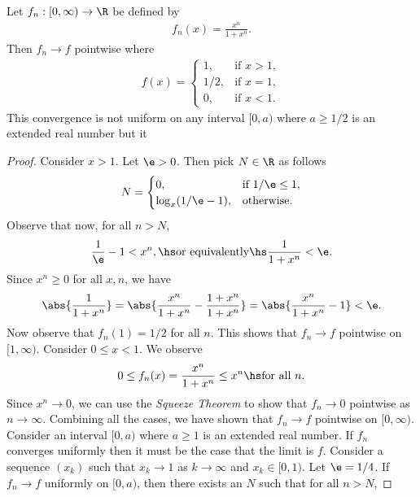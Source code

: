 \documentclass{article}
\begin{document}
\begin{claim*}
	Let $f_n:[0,\infty)\to\R$ be defined by
	\begin{align*}
		f_n(x) = \frac{x^n}{1+x^n}.
	\end{align*}
	Then $f_n\to f$ pointwise where
	\begin{align*}
		f(x) = \begin{cases}
			1,   & \text{if }x > 1, \\
			1/2, & \text{if }x = 1, \\
			0,   & \text{if }x < 1.
		\end{cases}
	\end{align*}
	This convergence is not uniform on any interval $[0, a)$ where
	$a\geq 1/2$ is an extended real number but it
\end{claim*}
\begin{proof}
	Consider $x>1$. Let $\e>0$. Then pick $N\in\R$ as follows
	\begin{align*}
		N = \begin{cases}
			0,              & \text{if }1/\e \leq 1, \\
			\log_x(1/\e-1), & \text{otherwise.}
		\end{cases}
	\end{align*}
	Observe that now, for all $n>N$,
	\begin{align*}
		\frac{1}{\e} - 1 < x^n,
		\hs\text{or equivalently}\hs
		\frac{1}{1+x^n}< \e.
	\end{align*}
	Since $x^n\geq 0$ for all $x,n$, we have
	\begin{align*}
		\abs{\frac{1}{1+x^n}}=\abs{\frac{x^n}{1+x^n}-\frac{1+x^n}{1+x^n}}
		=\abs{\frac{x^n}{1+x^n}-1}<\e.
	\end{align*}
	Now observe that $f_n(1)=1/2$ for all $n$.
	This shows that $f_n\to f$ pointwise on $[1,\infty)$. Consider $0\leq x<1$.
	We observe
	\begin{align*}
		0 \leq f_n(x)=\frac{x^n}{1 + x^n} \leq x^n\hs\text{for all }n.
	\end{align*}
	Since $x^n\to 0$, we can use the \emph{Squeeze Theorem} to show that
	$f_n\to 0$ pointwise as $n\to\infty$. Combining all the cases, we have shown that
	$f_n\to f$ pointwise on $[0, \infty)$. Consider an interval $[0,a)$ where $a\geq 1$
	is an extended real number. If $f_n$ converges uniformly then it must be the
	case that the limit is $f$. Consider a sequence $(x_k)$ such that $x_k\to 1$ as
	$k\to\infty$ and $x_k\in[0,1)$. Let $\e=1/4$. If $f_n\to f$ uniformly on $[0, a)$, then
	there exists an $N$ such that for all $n>N$,

\end{proof}
\end{document}
